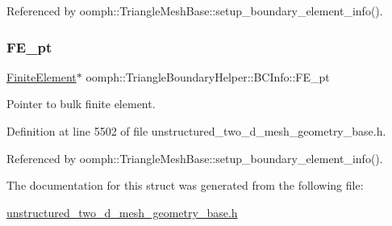 Referenced by oomph\+::\+Triangle\+Mesh\+Base\+::setup\+\_\+boundary\+\_\+element\+\_\+info().

\mbox{\label{structoomph_1_1TriangleBoundaryHelper_1_1BCInfo_a263292ad2a54d23d077ec612d52ddde6}} 
\subsubsection{\texorpdfstring{F\+E\+\_\+pt}{FE\_pt}}
{\footnotesize\ttfamily \hyperlink{classoomph_1_1FiniteElement}{Finite\+Element}$\ast$ oomph\+::\+Triangle\+Boundary\+Helper\+::\+B\+C\+Info\+::\+F\+E\+\_\+pt}



Pointer to bulk finite element. 



Definition at line 5502 of file unstructured\+\_\+two\+\_\+d\+\_\+mesh\+\_\+geometry\+\_\+base.\+h.



Referenced by oomph\+::\+Triangle\+Mesh\+Base\+::setup\+\_\+boundary\+\_\+element\+\_\+info().



The documentation for this struct was generated from the following file\+:\begin{DoxyCompactItemize}
\item 
\hyperlink{unstructured__two__d__mesh__geometry__base_8h}{unstructured\+\_\+two\+\_\+d\+\_\+mesh\+\_\+geometry\+\_\+base.\+h}\end{DoxyCompactItemize}
